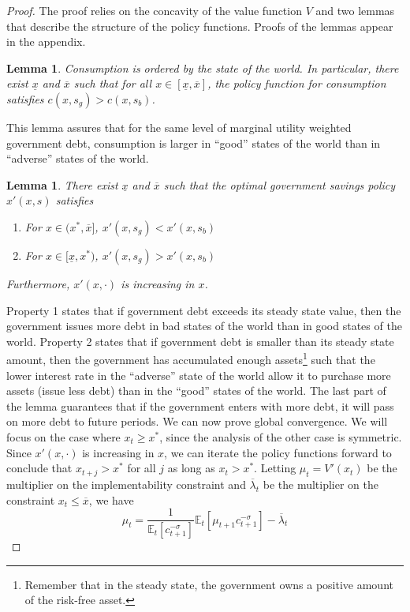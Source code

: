 \documentclass[12pt]{article}
\newcommand{\EE}{\mathbb E}
\newtheorem{lemma}[theorem]{Lemma}
\begin{document}
\begin{proof}  {The proof relies on the concavity of the value function $V$ and  two lemmas  that describe the structure of the policy functions.  Proofs of
 the lemmas appear in the appendix.
\begin{lemma}\label{lem:c_order}  Consumption is ordered by the state of the world.  In particular, there exist $\underline x$ and $\overline x$ such that for all $x\in[\underline x,\overline x]$, the policy function for consumption satisfies $c(x,s_g) > c(x,s_b)$.
\end{lemma}  This lemma assures that for the same level of marginal utility weighted government debt, consumption is larger in ``good'' states of the world than in ``adverse'' states of the world.
\begin{lemma}\label{lem:x_order}  There exist $\underline x$ and $\overline x$ such that the optimal government savings policy $x'(x,s)$ satisfies
\begin{enumerate}
	\item For $x\in(x^*,\overline x]$, $x'(x,s_g) < x'(x,s_b)$
	\item  For $x\in[\underline x, x^*)$, $x'(x,s_g) > x'(x,s_b)$
\end{enumerate}  Furthermore, $x'(x,\cdot)$ is increasing in $x$.
\end{lemma}  Property 1 states that if government debt exceeds its steady state value, then the government issues more debt in bad states of the world than in good states of the world.  Property 2 states that if government debt is smaller than its  steady state amount, then the government has accumulated enough assets\footnote{Remember that  in the steady state, the government  owns a positive amount of the risk-free asset.} such that the lower interest rate in the ``adverse'' state of the world allow it to purchase more assets (issue less debt) than in the ``good'' states of the world.   The last part of the lemma guarantees that if the government enters with more debt, it will pass on more debt to future periods.  We can now prove global convergence. We will focus on the case where $x_t \geq x^*$, since the analysis of the other case is symmetric. Since $x'(x,\cdot)$ is increasing in $x$, we can iterate the policy functions forward to conclude that $x_{t+j} > x^*$ for all $j$ as long as $x_t >x ^*$.  Letting $\mu_t = V'(x_t)$ be the multiplier on the
implementability constraint and $\overline \lambda_t$ be the multiplier on the constraint $x_t \leq \overline x$, we have
\[
	 \mu_t = \frac{1}{\EE_t[c_{t+1}^{-\sigma}]}\EE_t[\mu_{t+1}c_{t+1}^{-\sigma}] -\overline \lambda_t
\]}
\end{proof}
\end{document}
